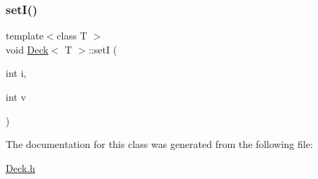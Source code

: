 \mbox{\label{class_deck_a1714bb774b90483499d9aab08a7a29ae}} 
\subsubsection{\texorpdfstring{set\+I()}{setI()}}
{\footnotesize\ttfamily template$<$class T $>$ \\
void \mbox{\hyperlink{class_deck}{Deck}}$<$ T $>$\+::setI (\begin{DoxyParamCaption}\item[{int}]{i,  }\item[{int}]{v }\end{DoxyParamCaption})}



The documentation for this class was generated from the following file\+:\begin{DoxyCompactItemize}
\item 
\mbox{\hyperlink{_deck_8h}{Deck.\+h}}\end{DoxyCompactItemize}
